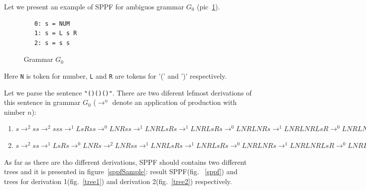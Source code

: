 \documentclass{sig-alternate} %
\begin{document}
Let we present an example of SPPF for ambiguos grammar $G_0$ (pic~\ref{grammarG0}).

\begin{figure}[h]
   \begin{center}
\begin{verbatim}
   0: s = NUM
   1: s = L s R
   2: s = s s
\end{verbatim}
   \caption{Grammar $G_0$}
   \label{grammarG0}        
   \end{center}
\end{figure}

Here \verb|N| is token for number, \verb|L| and \verb|R| are tokens for '(' and ')'  respectively.

Let we parse the sentence \verb|"()()()"|. 
There are two diferent lefmost derivations of this sentence in grammar $G_0$ ($\rightarrow ^ n$ denote an application of production with nimber $n$): 
\begin{enumerate} 
    \item $s \rightarrow ^ 2 s s \rightarrow ^ 2 s s s \rightarrow ^ 1 L s R s s \rightarrow ^ 0 L N R s s \rightarrow ^ 1 
    L N R L s R s \rightarrow ^ 1 L N R L s R s \rightarrow ^ 0 L N R L N R s \rightarrow ^ 1 L N R L N R L s R \rightarrow ^ 0 L N R L N R L N R$
    \item $s \rightarrow ^ 2 s s \rightarrow ^ 1 L s R s  \rightarrow ^ 0 L N R s \rightarrow ^ 2 L N R s s  \rightarrow ^ 1 
    L N R L s R s \rightarrow ^ 1 L N R L s R s \rightarrow ^ 0 L N R L N R s \rightarrow ^ 1 L N R L N R L s R \rightarrow ^ 0 L N R L N R L N R$
\end{enumerate}
 
    As far as there are tho different derivations, SPPF should contains two different trees and it is presented in figure~\ref{sppfSample}: result SPPF(fig. ~\ref{sppf}) and trees for derivation 1(fig.~\ref{tree1}) and derivation 2(fig.~\ref{tree2}) respectively. 
 
\end{document}
